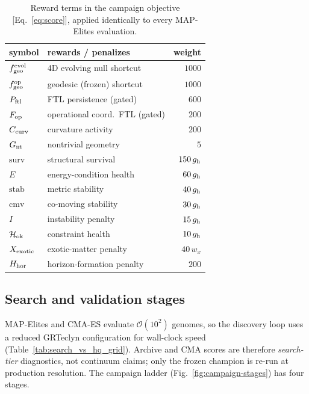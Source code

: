 \documentclass[twocolumn,floatfix,aps,prd,nofootinbib]{revtex4-2}
\begin{document}
\begin{table}[tbp]
\caption{Reward terms in the campaign objective [Eq.~\eqref{eq:score}], applied
identically to every MAP-Elites evaluation.}
\label{tab:weights}
\begin{ruledtabular}
\begin{tabular}{llr}
symbol & rewards / penalizes & weight \\
\hline
$f_{\rm geo}^{\rm evol}$ & 4D evolving null shortcut & $1000$ \\
$f_{\rm geo}^{\rm op}$ & geodesic (frozen) shortcut & $1000$ \\
$P_{\rm ftl}$ & FTL persistence (gated) & $600$ \\
$F_{\rm op}$ & operational coord.\ FTL (gated) & $200$ \\
$C_{\rm curv}$ & curvature activity & $200$ \\
$G_{\rm nt}$ & nontrivial geometry & $5$ \\
$\mathrm{surv}$ & structural survival & $150\,g_{\rm h}$ \\
$E$ & energy-condition health & $60\,g_{\rm h}$ \\
$\mathrm{stab}$ & metric stability & $40\,g_{\rm h}$ \\
$\mathrm{cmv}$ & co-moving stability & $30\,g_{\rm h}$ \\
$I$ & instability penalty & $15\,g_{\rm h}$ \\
$\mathcal H_{\rm ok}$ & constraint health & $10\,g_{\rm h}$ \\
$X_{\rm exotic}$ & exotic-matter penalty & $40\,w_{x}$ \\
$H_{\rm hor}$ & horizon-formation penalty & $200$ \\
\end{tabular}
\end{ruledtabular}
\end{table}

\subsection{Search and validation stages}
\label{sec:stages}

MAP-Elites and CMA-ES evaluate $\mathcal{O}(10^2)$ genomes, so the discovery
loop uses a reduced GRTeclyn configuration for wall-clock speed
(Table~\ref{tab:search_vs_hq_grid}). Archive and CMA scores are therefore
\emph{search-tier} diagnostics, not continuum claims; only the frozen champion
is re-run at production resolution. The campaign ladder
(Fig.~\ref{fig:campaign-stages}) has four stages.
\end{document}

